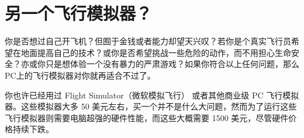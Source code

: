 \section{另一个飞行模拟器？}
\fi
\ifchinese
{}
\fi

\ifchinese
你是否想过自己开飞机？但囿于金钱或者能力却望天兴叹？若你是个真实飞行员希望在地面提高自己的技术？或你是否希望挑战一些危险的动作，而不用担心生命安全？亦或你只是想体验一个没有暴力的严肃游戏？如果你符合以上任何问题，那么PC上的飞行模拟器对你就再适合不过了。

你也许已经用过  Flight Simulator（微软模拟飞行） 或者其他商业级 PC 飞行模拟器。这些模拟器大多 50 美元左右，买一个并不是什么大问题，然而为了运行这些飞行模拟器则需要电脑超强的硬件性能，而这些大概需要 1500 美元，尽管硬件价格持续下跌。

